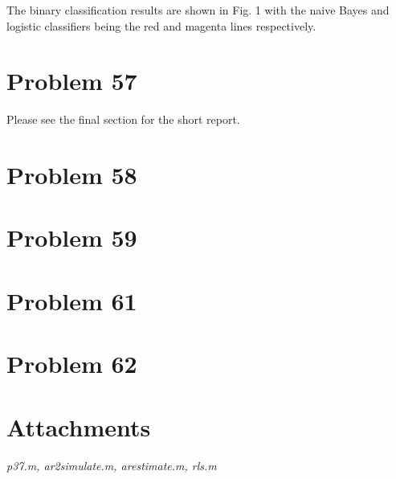 \documentclass[a4paper, 11pt]{article}
\begin{document}
The binary classification results are shown in Fig. 1 with the naive Bayes and logistic classifiers being the red and magenta lines respectively. 




\section*{Problem 57}

Please see the final section for the short report. 


\section*{Problem 58}





\section*{Problem 59}





\section*{Problem 61}




\section*{Problem 62}




\section*{Attachments}
\textit{p37.m, ar2simulate.m, arestimate.m, rls.m}
\end{document}
